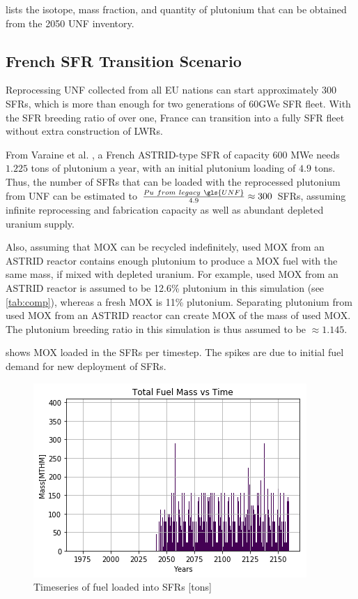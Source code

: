  lists the isotope, mass fraction,
and quantity of plutonium that can be obtained from the 2050 \gls{UNF} inventory.


\subsection{French \gls{SFR} Transition Scenario}

Reprocessing \gls{UNF} collected from all EU nations can start approximately
300 \glspl{SFR}, which is more than enough for two generations of 60GWe \gls{SFR}
fleet. With the \gls{SFR} breeding ratio of over one, France can transition into
a fully \gls{SFR} fleet without extra construction of \glspl{LWR}. 

From Varaine et al. \cite{marsaultmarie-sophie_pre-conceptual_2012}, a French
ASTRID-type \gls{SFR} of capacity 600 MWe needs $1.225$ tons of
plutonium a year, with an initial plutonium loading of $4.9$ tons. 
Thus, the number of \glspl{SFR} that can be loaded with the reprocessed
plutonium from \gls{UNF} can be estimated to $\frac{Pu \ from \ legacy \ \gls{UNF}}{4.9} \approx 300$ \glspl{SFR},
assuming infinite reprocessing and fabrication capacity as well as
abundant depleted uranium supply. 

Also, assuming that \gls{MOX} can be recycled indefinitely,
used \gls{MOX} from an ASTRID reactor
contains enough plutonium to produce a \gls{MOX} fuel with
the same mass, if mixed with depleted uranium. For example,
used \gls{MOX} from an ASTRID reactor is assumed to be 12.6\% plutonium
in this simulation (see \cref{tab:comp}), whereas a fresh \gls{MOX} is 11\% plutonium.
Separating plutonium from used \gls{MOX} from
an ASTRID reactor can create \gls{MOX} of the mass of used \gls{MOX}.
The plutonium breeding ratio in this simulation is thus assumed to be
$\approx 1.145$.

 shows \gls{MOX} loaded in the \glspl{SFR} per timestep.
The spikes are due to initial fuel demand for new deployment of \glspl{SFR}.

\begin{figure}[htbp!]
	\begin{center}
		\includegraphics[scale=0.7]{./images/french-transition/fuel_no_cum.png}
	\end{center}
	\caption{Timeseries of fuel loaded into \glspl{SFR} [tons]}
	\label{fig:fuel}
\end{figure}

